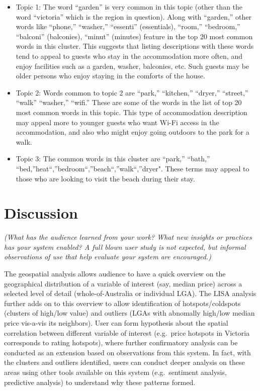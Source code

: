 \documentclass{acm_proc_article-sp}
\begin{document}
\begin{itemize}
\item
  Topic 1: The word ``garden'' is very common in this topic (other than
  the word ``victoria'' which is the region in question). Along with
  ``garden,'' other words like ``phone,'' ``washer,'' ``essenti''
  (essentials), ``room,'' ``bedroom,'' ``balconi'' (balconies),
  ``minut'' (minutes) feature in the top 20 most common words in this
  cluster. This suggests that listing descriptions with these words tend
  to appeal to guests who stay in the accommodation more often, and
  enjoy facilities such as a garden, washer, balconies, etc. Such guests
  may be older persons who enjoy staying in the comforts of the house.
\item
  Topic 2: Words common to topic 2 are ``park,'' ``kitchen,'' ``dryer,''
  ``street,'' ``walk'' ``washer,'' ``wifi.'' These are some of the words
  in the list of top 20 most common words in this topic. This type of
  accommodation description may appeal more to younger guests who want
  Wi-Fi access in the accommodation, and also who might enjoy going
  outdoors to the park for a walk.
\item
  Topic 3: The common words in this cluster are ``park,'' ``bath,''
  ``bed,''heat``,''bedroom``,''beach``,''walk``,''dryer". These terms
  may appeal to those who are looking to visit the beach during their
  stay.
\end{itemize}

\hypertarget{discussion}{%
\section{Discussion}\label{discussion}}

\emph{(What has the audience learned from your work? What new insights
or practices has your system enabled? A full blown user study is not
expected, but informal observations of use that help evaluate your
system are encouraged.)}

The geospatial analysis allows audience to have a quick overview on the
geographical distribution of a variable of interest (say, median price)
across a selected level of detail (whole-of-Australia or individual
LGA). The LISA analysis further adds on to this overview to allow
identification of hotspots/coldspots (clusters of high/low value) and
outliers (LGAs with abnomally high/low median price vis-a-vis its
neighbors). User can form hypothesis about the spatial correlation
between different variable of interest (e.g.~price hotspots in Victoria
corresponds to rating hotspots), where further confirmatory analysis can
be conducted as an extension based on observations from this system. In
fact, with the clusters and outliers identified, users can conduct
deeper analysis on these areas using other tools available on this
system (e.g.~sentiment analysis, predictive analysis) to understand why
these patterns formed.
\end{document}
